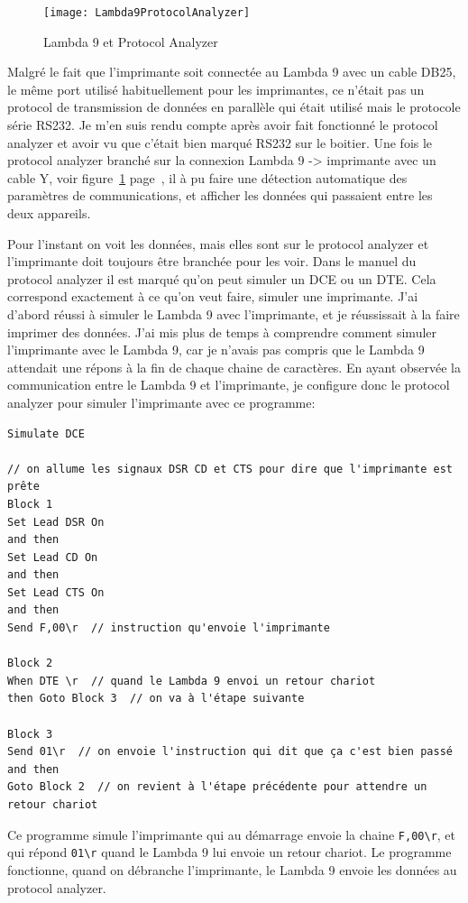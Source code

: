 \documentclass[12pt]{article}
\begin{document}
\begin{figure}[h]
	\centering
	\texttt{[image: Lambda9ProtocolAnalyzer]}
	\caption{Lambda 9 et Protocol Analyzer}
	\label{fig:lambda9HP}
\end{figure}


Malgré le fait que l'imprimante soit connectée au Lambda 9 avec un cable DB25, le même port utilisé habituellement pour les imprimantes, ce n'était pas un protocol de transmission de données en parallèle qui était utilisé mais le protocole série RS232.
Je m'en suis rendu compte après avoir fait fonctionné le protocol analyzer et avoir vu que c'était bien marqué RS232 sur le boitier.
Une fois le protocol analyzer branché sur la connexion Lambda 9 -> imprimante avec un cable Y, voir figure~\ref{fig:lambda9HP} page~\pageref{fig:lambda9HP}, il à pu faire une détection automatique des paramètres de communications, et afficher les données qui passaient entre les deux appareils.

Pour l'instant on voit les données, mais elles sont sur le protocol analyzer et l'imprimante doit toujours être branchée pour les voir.
Dans le manuel du protocol analyzer il est marqué qu'on peut simuler un DCE ou un DTE.
Cela correspond exactement à ce qu'on veut faire, simuler une imprimante.
J'ai d'abord réussi à simuler le Lambda 9 avec l'imprimante, et je réussissait à la faire imprimer des données.
J'ai mis plus de temps à comprendre comment simuler l'imprimante avec le Lambda 9, car je n'avais pas compris que le Lambda 9 attendait une répons à la fin de chaque chaine de caractères.
En ayant observée la communication entre le Lambda 9 et l'imprimante, je configure donc le protocol analyzer pour simuler l'imprimante avec ce programme:

\FloatBarrier
\begin{lstlisting}
Simulate DCE

// on allume les signaux DSR CD et CTS pour dire que l'imprimante est prête
Block 1
Set Lead DSR On
and then
Set Lead CD On
and then
Set Lead CTS On
and then
Send F,00\r  // instruction qu'envoie l'imprimante

Block 2
When DTE \r  // quand le Lambda 9 envoi un retour chariot
then Goto Block 3  // on va à l'étape suivante

Block 3
Send 01\r  // on envoie l'instruction qui dit que ça c'est bien passé
and then
Goto Block 2  // on revient à l'étape précédente pour attendre un retour chariot
\end{lstlisting}

Ce programme simule l'imprimante qui au démarrage envoie la chaine \verb|F,00\r|, et qui répond \verb|01\r| quand le Lambda 9 lui envoie un retour chariot.
Le programme fonctionne, quand on débranche l'imprimante, le Lambda 9 envoie les données au protocol analyzer.
\end{document}
